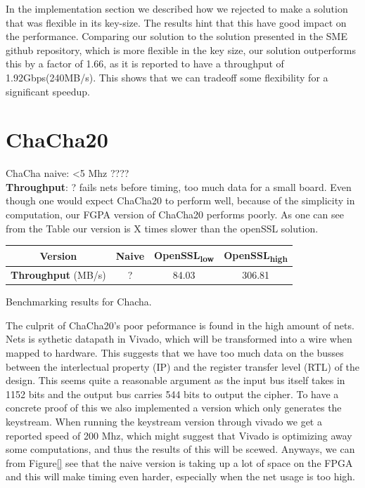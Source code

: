 \documentclass[a4paper, openany]{book}
\begin{document}
In the implementation section we described how we rejected to make a solution that was flexible in its key-size. The results hint that this have good impact on the performance. Comparing our solution to the solution presented in the SME github repository, which is more flexible in the key size, our solution outperforms this by a factor of 1.66, as it is reported to have a throughput of 1.92Gbps(240MB/s)\cite{sme}. This shows that we can tradeoff some flexibility for a significant speedup.


\section{ChaCha20}
\label{sec:org7add56f}
ChaCha naive: <5 Mhz ????\\
\textbf{Throughput}: ?
fails nets before timing, too much data for a small board.
Even though one would expect ChaCha20 to perform well, because of the simplicity in computation, our FGPA version of ChaCha20 performs poorly. As one can see from the Table our version is X times slower than the openSSL solution.
\begin{table}[htbp]
\centering
\begin{tabular}{|c|c|c|c|}
\hline
\textbf{Version} & Naive & OpenSSL\textsubscript{low} & OpenSSL\textsubscript{high}\\
\hline
\textbf{Throughput} (MB/s) & ? & 84.03 & 306.81\\
\hline
\end{tabular}
Benchmarking results for Chacha.

\end{table}
The culprit of ChaCha20's poor peformance is found in the high amount of nets. Nets is sythetic datapath in Vivado, which will be transformed into a wire when mapped to hardware. This suggests that we have too much data on the busses between the interlectual property (IP) and the register transfer level (RTL) of the design. This seems quite a reasonable argument as the input bus itself takes in 1152 bits and the output bus carries 544 bits to output the cipher.
To have a concrete proof of this we also implemented a version which only generates the keystream. When running the keystream version through vivado we get a reported speed of 200 Mhz, which might suggest that Vivado is optimizing away some computations, and thus the results of this will be scewed. Anyways, we can from Figure\ref{} see that the naive version is taking up a lot of space on the FPGA and this will make timing even harder, especially when the net usage is too high.
\end{document}
